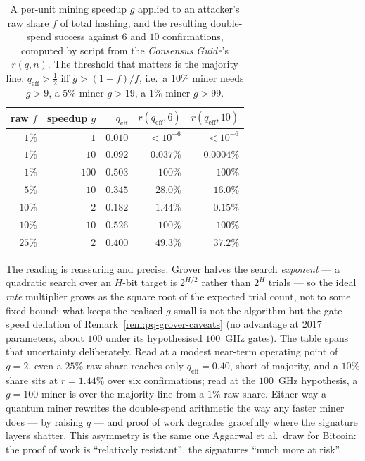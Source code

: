 \documentclass[11pt,a4paper]{article}
\theoremstyle{definition}
\begin{document}
\begin{table}[ht]
\centering
\small
\begin{tabular}{@{}r r r r r@{}}
\toprule
raw $f$ & speedup $g$ & $q_{\mathrm{eff}}$ & $r(q_{\mathrm{eff}},6)$ &
$r(q_{\mathrm{eff}},10)$ \\
\midrule
$1\%$  & $1$   & $0.010$ & ${<}10^{-6}$ & ${<}10^{-6}$ \\
$1\%$  & $10$  & $0.092$ & $0.037\%$    & $0.0004\%$ \\
$1\%$  & $100$ & $0.503$ & $100\%$      & $100\%$ \\
$5\%$  & $10$  & $0.345$ & $28.0\%$     & $16.0\%$ \\
$10\%$ & $2$   & $0.182$ & $1.44\%$     & $0.15\%$ \\
$10\%$ & $10$  & $0.526$ & $100\%$      & $100\%$ \\
$25\%$ & $2$   & $0.400$ & $49.3\%$     & $37.2\%$ \\
\bottomrule
\end{tabular}
\caption{A per-unit mining speedup $g$ applied to an attacker's raw
share $f$ of total hashing, and the resulting double-spend success
against $6$ and $10$ confirmations, computed by script from the
\emph{Consensus Guide}'s $r(q, n)$. The threshold that matters is the
majority line: $q_{\mathrm{eff}} > \tfrac12$ iff $g > (1 - f)/f$, i.e.\
a $10\%$ miner needs $g > 9$, a $5\%$ miner $g > 19$, a $1\%$ miner
$g > 99$.}
\label{tab:pq-qeff}
\end{table}

The reading is reassuring and precise. Grover halves the search
\emph{exponent} --- a quadratic search over an $H$-bit target is
$2^{H/2}$ rather than $2^H$ trials --- so the ideal \emph{rate}
multiplier grows as the square root of the expected trial count, not to
some fixed bound; what keeps the realised $g$ small is not the algorithm
but the gate-speed deflation of Remark~\ref{rem:pq-grover-caveats} (no
advantage at 2017 parameters, about $100$ under its hypothesised
$100$~GHz gates). The table spans that uncertainty deliberately. Read
at a modest near-term operating point of $g = 2$, even a $25\%$ raw
share reaches only $q_{\mathrm{eff}} = 0.40$, short of majority, and a
$10\%$ share sits at $r = 1.44\%$ over six confirmations; read at the
$100$~GHz hypothesis, a $g = 100$ miner is over the majority line from a
$1\%$ raw share. Either way a quantum miner rewrites the double-spend
arithmetic the way any faster miner does --- by raising $q$ --- and
proof of work degrades gracefully where the signature layers shatter.
This asymmetry is the same one Aggarwal et
al.\ draw for Bitcoin: the proof of work is ``relatively resistant'',
the signatures ``much more at risk''.
\end{document}
